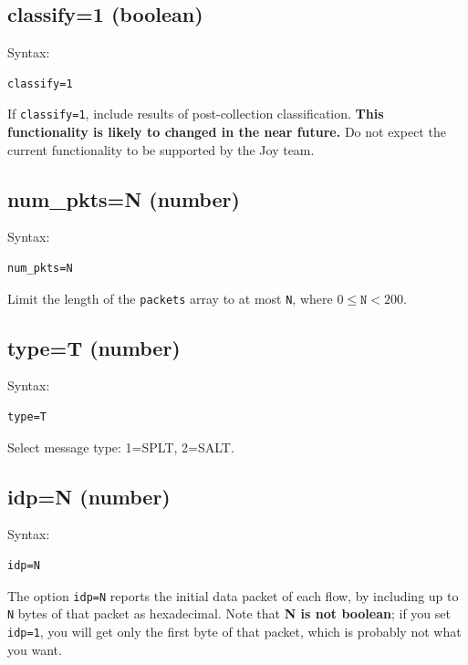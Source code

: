 \documentclass{book}
\begin{document}
\subsection{classify=1 (boolean)}
\label{classify}
\begin{mdframed}[style=aaa]
Syntax:
  \begin{verbatim}
classify=1                 
  \end{verbatim}
\end{mdframed}
If \texttt{classify=1}, include results of post-collection classification.
\textbf{This functionality is likely to changed in the near future.}
Do not expect the current functionality to be supported by the Joy
team.

\subsection{num\_pkts=N (number)}
\label{numpkts}
\begin{mdframed}[style=aaa]
Syntax:
  \begin{verbatim}
num_pkts=N                 
  \end{verbatim}
\end{mdframed}
Limit the length of the \texttt{packets} array to at most \texttt{N},
where $0 \leq \texttt{N} < 200$.

\subsection{type=T (number)}
\label{type}
\begin{mdframed}[style=aaa]
Syntax:
  \begin{verbatim}
type=T                     
  \end{verbatim}
\end{mdframed}
Select message type: 1=SPLT, 2=SALT.

\subsection{idp=N (number)}
\label{idp}
\begin{mdframed}[style=aaa]
Syntax:
  \begin{verbatim}
idp=N                      
  \end{verbatim}
\end{mdframed}
The option \texttt{idp=N} reports the initial data packet of each
flow, by including up to \texttt{N} bytes of that packet as
hexadecimal.  Note that \textbf{N is not boolean}; if you set
\texttt{idp=1}, you will get only the first byte of that packet, which
is probably not what you want.
\end{document}
